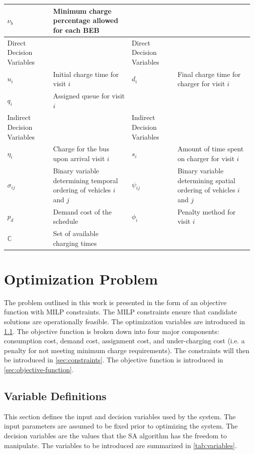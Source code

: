 \documentclass[energies,article,submit,moreauthors]{Definitions/mdpi}
\newcommand{\C}{\mathbb{C}}                 %
\begin{document}
\begin{table}[htbp]
\begin{tabularx}{\textwidth}{L{0.3} L{1.2} L{0.3} L{1.2}}
\(\nu_b\) & Minimum charge percentage allowed for each BEB &  & \\[0pt]
\hline
Direct Decision Variables &  & Direct Decision Variables & \\[0pt]
\(u_i\) & Initial charge time for visit \(i\) & \(d_i\) & Final charge time for charger for visit \(i\)\\[0pt]
\(q_i\) & Assigned queue for visit \(i\) &  & \\[0pt]
Indirect Decision Variables &  & Indirect Decision Variables & \\[0pt]
\(\eta_i\) & Charge for the bus upon arrival visit \(i\) & \(s_i\) & Amount of time spent on charger for visit \(i\)\\[0pt]
\(\sigma_{ij}\) & Binary variable determining temporal ordering of vehicles \(i\) and \(j\) & \(\psi_{ij}\) & Binary variable determining spatial ordering of vehicles \(i\) and \(j\)\\[0pt]
\(p_{d}\) & Demand cost of the schedule & \(\phi_i\) & Penalty method for visit \(i\)\\[0pt]
\(\C\) & Set of available charging times &  & \\[0pt]
\hline
\end{tabularx}
\end{table}
\section{Optimization Problem}
\label{sec:optimization-problem}
The problem outlined in this work is presented in the form of an objective function with MILP constraints. The MILP
constraints ensure that candidate solutions are operationally feasible. The optimization variables are introduced in
\ref{sec:parameter-definitions}. The objective function is broken down into four major components: consumption cost, demand
cost, assignment cost, and under-charging cost (i.e. a penalty for not meeting minimum charge requirements). The
constraints will then be introduced in \ref{sec:constraints}. The objective function is introduced in
\ref{sec:objective-function}.

\subsection{Variable Definitions}
\label{sec:parameter-definitions}
This section defines the input and decision variables used by the system. The input parameters are assumed to be fixed
prior to optimizing the system. The decision variables are the values that the SA algorithm has the freedom to
manipulate. The variables to be introduced are summarized in \ref{tab:variables}.
\end{document}
